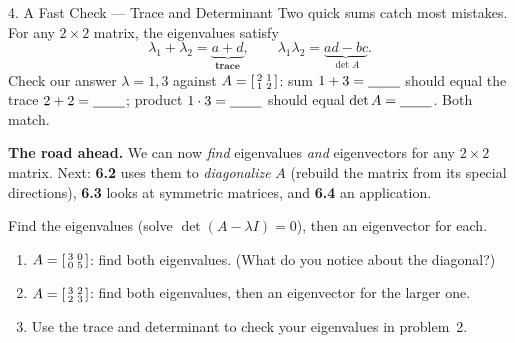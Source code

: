 \documentclass[10pt]{article}
\begin{document}
\begin{notesbox}{4. A Fast Check --- Trace and Determinant}
Two quick sums catch most mistakes. For any $2\times2$ matrix, the eigenvalues satisfy
\[
  \lambda_1+\lambda_2=\underbrace{a+d}_{\textbf{trace}},\qquad
  \lambda_1\lambda_2=\underbrace{ad-bc}_{\det A}.
\]
Check our answer $\lambda=1,3$ against $A=\begin{bsmallmatrix} 2 & 1\\ 1 & 2 \end{bsmallmatrix}$:
sum $1+3=\blank{0.8cm}$ should equal the trace $2+2=\blank{0.8cm}$; product $1\cdot3=\blank{0.8cm}$
should equal $\det A=\blank{0.8cm}$. \; Both match.

\vspace{3pt}
\textbf{The road ahead.} We can now \emph{find} eigenvalues \emph{and} eigenvectors for any $2\times2$
matrix. Next: \textbf{6.2} uses them to \emph{diagonalize} $A$ (rebuild the matrix from its special
directions), \textbf{6.3} looks at symmetric matrices, and \textbf{6.4} an application.
\end{notesbox}

\begin{practicebox}
Find the eigenvalues (solve $\det(A-\lambda I)=0$), then an eigenvector for each.
\begin{enumerate}[leftmargin=1.6em, itemsep=6pt]
  \item $A=\begin{bsmallmatrix} 3 & 0\\ 0 & 5 \end{bsmallmatrix}$: find both eigenvalues. (What do you notice about the diagonal?) \writeline
  \item $A=\begin{bsmallmatrix} 3 & 2\\ 2 & 3 \end{bsmallmatrix}$: find both eigenvalues, then an eigenvector for the larger one. 
  \item Use the trace and determinant to check your eigenvalues in problem~2. \writeline
\end{enumerate}
\end{practicebox}
\end{document}
